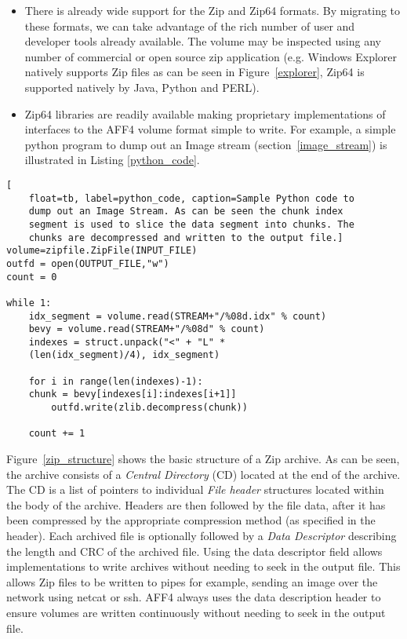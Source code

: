 \documentclass[10pt, conference]{IEEEtran}
\begin{document}
\begin{itemize}
\item There is already wide support for the Zip and Zip64 formats. By
  migrating to these formats, we can take advantage of the rich number
  of user and developer tools already available. The volume may be
  inspected using any number of commercial or open source zip
  application (e.g. Windows Explorer natively supports Zip files as
  can be seen in Figure~\ref{explorer}, Zip64 is supported natively
  by Java, Python and PERL).
 
\item Zip64 libraries are readily available making proprietary implementations of
  interfaces to the AFF4 volume format simple to write. For example, a
  simple python program to dump out an Image stream
  (section~\ref{image_stream}) is illustrated in Listing
  \ref{python_code}.

\end{itemize}

\begin{lstlisting}[
	float=tb, label=python_code, caption=Sample Python code to
	dump out an Image Stream. As can be seen the chunk index
	segment is used to slice the data segment into chunks. The
	chunks are decompressed and written to the output file.]
volume=zipfile.ZipFile(INPUT_FILE)
outfd = open(OUTPUT_FILE,"w")
count = 0

while 1:
    idx_segment = volume.read(STREAM+"/%08d.idx" % count)
    bevy = volume.read(STREAM+"/%08d" % count)
    indexes = struct.unpack("<" + "L" * 
	(len(idx_segment)/4), idx_segment)

    for i in range(len(indexes)-1):
	chunk = bevy[indexes[i]:indexes[i+1]]
        outfd.write(zlib.decompress(chunk))

    count += 1
\end{lstlisting}

Figure~\ref{zip_structure} shows the basic structure of a Zip
archive. As can be seen, the archive consists of a {\em Central Directory} (CD)
located at the end of the archive. The CD is a list of pointers to
individual {\em File header} structures located within the body of the
archive. Headers are then followed by the file data, after it has been
compressed by the appropriate compression method (as specified in the
header). Each archived file is optionally followed by a {\em Data
Descriptor} describing the length and CRC of the archived file. Using
the data descriptor field allows implementations to write archives
without needing to seek in the output file. This allows Zip files to
be written to pipes for example, sending an image over the network
using netcat or ssh. AFF4 always uses the data description header to
ensure volumes are written continuously without needing to seek in the
output file.
\end{document}
